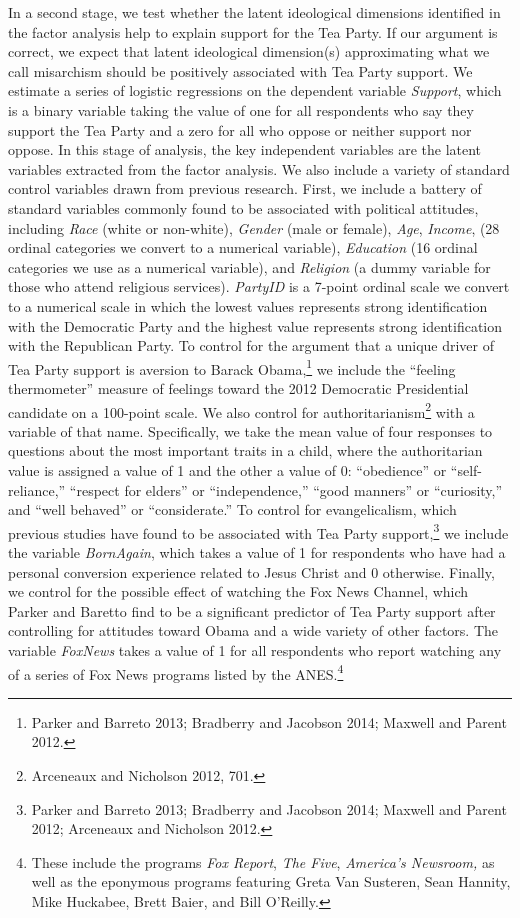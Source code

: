 \documentclass[12pt,]{article}
\begin{document}
In a second stage, we test whether the latent ideological dimensions
identified in the factor analysis help to explain support for the Tea
Party. If our argument is correct, we expect that latent ideological
dimension(s) approximating what we call misarchism should be positively
associated with Tea Party support. We estimate a series of logistic
regressions on the dependent variable \emph{Support}, which is a binary
variable taking the value of one for all respondents who say they
support the Tea Party and a zero for all who oppose or neither support
nor oppose. In this stage of analysis, the key independent variables are
the latent variables extracted from the factor analysis. We also include
a variety of standard control variables drawn from previous research.
First, we include a battery of standard variables commonly found to be
associated with political attitudes, including \emph{Race} (white or
non-white), \emph{Gender} (male or female), \emph{Age}, \emph{Income},
(28 ordinal categories we convert to a numerical variable),
\emph{Education} (16 ordinal categories we use as a numerical variable),
and \emph{Religion} (a dummy variable for those who attend religious
services). \emph{PartyID} is a 7-point ordinal scale we convert to a
numerical scale in which the lowest values represents strong
identification with the Democratic Party and the highest value
represents strong identification with the Republican Party. To control
for the argument that a unique driver of Tea Party support is aversion
to Barack Obama,\footnote{Parker and Barreto 2013; Bradberry and
  Jacobson 2014; Maxwell and Parent 2012. } we include the ``feeling
thermometer'' measure of feelings toward the 2012 Democratic
Presidential candidate on a 100-point scale. We also control for
authoritarianism\footnote{Arceneaux and Nicholson 2012, 701. } with a
variable of that name. Specifically, we take the mean value of four
responses to questions about the most important traits in a child, where
the authoritarian value is assigned a value of 1 and the other a value
of 0: ``obedience'' or ``self-reliance,'' ``respect for elders'' or
``independence,'' ``good manners'' or ``curiosity,'' and ``well
behaved'' or ``considerate.'' To control for evangelicalism, which
previous studies have found to be associated with Tea Party
support,\footnote{Parker and Barreto 2013; Bradberry and Jacobson 2014;
  Maxwell and Parent 2012; Arceneaux and Nicholson 2012. } we include
the variable \emph{BornAgain}, which takes a value of 1 for respondents
who have had a personal conversion experience related to Jesus Christ
and 0 otherwise. Finally, we control for the possible effect of watching
the Fox News Channel, which Parker and Baretto find to be a significant
predictor of Tea Party support after controlling for attitudes toward
Obama and a wide variety of other factors. The variable \emph{FoxNews}
takes a value of 1 for all respondents who report watching any of a
series of Fox News programs listed by the ANES.\footnote{These include
  the programs \emph{Fox Report}, \emph{The Five}, \emph{America's
  Newsroom,} as well as the eponymous programs featuring Greta Van
  Susteren, Sean Hannity, Mike Huckabee, Brett Baier, and Bill O'Reilly.}
\end{document}
